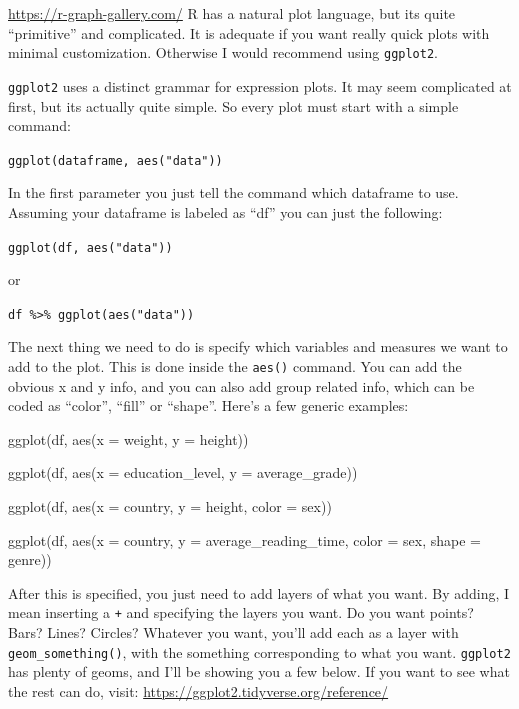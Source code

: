 \documentclass[
]{book}
\newenvironment{Shaded}{\begin{snugshade}}{\end{snugshade}}
\newcommand{\AttributeTok}[1]{\textcolor[rgb]{0.77,0.63,0.00}{#1}}
\newcommand{\FunctionTok}[1]{\textcolor[rgb]{0.00,0.00,0.00}{#1}}
\newcommand{\NormalTok}[1]{#1}
\begin{document}
\url{https://r-graph-gallery.com/}
R has a natural plot language, but its quite ``primitive'' and complicated.
It is adequate if you want really quick plots with minimal customization.
Otherwise I would recommend using \texttt{ggplot2}.

\texttt{ggplot2} uses a distinct grammar for expression plots.
It may seem complicated at first, but its actually quite simple.
So every plot must start with a simple command:

\texttt{ggplot(dataframe,\ aes("data"))}

In the first parameter you just tell the command which dataframe to use.
Assuming your dataframe is labeled as ``df'' you can just the following:

\texttt{ggplot(df,\ aes("data"))}

or

\texttt{df\ \%\textgreater{}\%\ ggplot(aes("data"))}

The next thing we need to do is specify which variables and measures we want to add to the plot.
This is done inside the \texttt{aes()} command.
You can add the obvious x and y info, and you can also add group related info, which can be coded as ``color'', ``fill'' or ``shape''.
Here's a few generic examples:

\begin{Shaded}
\begin{Highlighting}[]
\FunctionTok{ggplot}\NormalTok{(df, }\FunctionTok{aes}\NormalTok{(}\AttributeTok{x =}\NormalTok{ weight, }\AttributeTok{y =}\NormalTok{ height))}

\FunctionTok{ggplot}\NormalTok{(df, }\FunctionTok{aes}\NormalTok{(}\AttributeTok{x =}\NormalTok{ education\_level, }\AttributeTok{y =}\NormalTok{ average\_grade))}

\FunctionTok{ggplot}\NormalTok{(df, }\FunctionTok{aes}\NormalTok{(}\AttributeTok{x =}\NormalTok{ country, }\AttributeTok{y =}\NormalTok{ height, }\AttributeTok{color =}\NormalTok{ sex))}

\FunctionTok{ggplot}\NormalTok{(df, }\FunctionTok{aes}\NormalTok{(}\AttributeTok{x =}\NormalTok{ country, }\AttributeTok{y =}\NormalTok{ average\_reading\_time,}
               \AttributeTok{color =}\NormalTok{ sex, }\AttributeTok{shape =}\NormalTok{ genre))}
\end{Highlighting}
\end{Shaded}

After this is specified, you just need to add layers of what you want.
By adding, I mean inserting a \texttt{+} and specifying the layers you want.
Do you want points?
Bars?
Lines?
Circles?
Whatever you want, you'll add each as a layer with \texttt{geom\_something()}, with the something corresponding to what you want.
\texttt{ggplot2} has plenty of geoms, and I'll be showing you a few below.
If you want to see what the rest can do, visit: \url{https://ggplot2.tidyverse.org/reference/}
\end{document}
